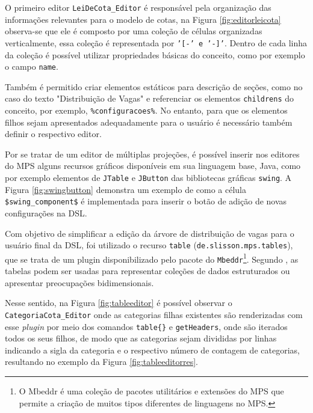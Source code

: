 O primeiro editor \texttt{LeiDeCota\_Editor} é responsável pela organização das informações relevantes para o modelo de cotas, na Figura \ref{fig:editorleicota} observa-se que ele é composto por uma coleção de células organizadas verticalmente, essa coleção é representada por \texttt{'[-' e '-]'}. Dentro de cada linha da coleção é possível utilizar propriedades básicas do conceito, como por exemplo o campo \texttt{name}. 




\newpage
Também é permitido criar elementos estáticos para descrição de seções, como no caso do texto "Distribuição de Vagas" e referenciar os elementos \texttt{childrens} do conceito, por exemplo, \texttt{\%configuracoes\%}. No entanto, para que os elementos filhos sejam apresentados adequadamente para o usuário é necessário também definir o respectivo editor.

Por se tratar de um editor de múltiplas projeções, é possível inserir nos editores do \gls{MPS} alguns recursos gráficos disponíveis em sua linguagem base, Java, como por exemplo elementos de \texttt{JTable} e \texttt{JButton} das bibliotecas gráficas \texttt{swing}. A Figura \ref{fig:swingbutton} demonstra um exemplo de como a célula \texttt{\$swing\_component\$} é implementada para inserir o botão de adição de novas configurações na DSL.



Com objetivo de simplificar a edição da árvore de distribuição de vagas para o usuário final da DSL, foi utilizado o recurso \texttt{table} (\texttt{de.slisson.mps.tables}), que se trata de um plugin disponibilizado pelo pacote do \texttt{Mbeddr}\footnote{O Mbeddr é uma coleção de pacotes utilitários e extensões do MPS que permite a criação de muitos tipos diferentes de linguagens no \gls{MPS}.}. Segundo , as tabelas podem ser usadas para representar coleções de dados estruturados ou apresentar preocupações bidimensionais.

Nesse sentido, na Figura \ref{fig:tableeditor} é possível observar o \texttt{CategoriaCota\_Editor} onde as categorias filhas existentes são renderizadas com esse \textit{plugin} por meio dos comandos \texttt{table\{\}} e \texttt{getHeaders}, onde são iterados todos os seus filhos, de modo que as categorias sejam divididas por linhas indicando a sigla da categoria e o respectivo número de contagem de categorias, resultando no exemplo da Figura \ref{fig:tableeditorres}.

